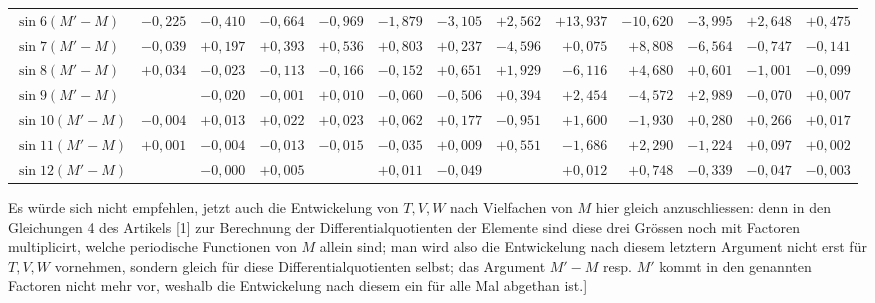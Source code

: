 \begin{landscape}
\begin{longtable}{@{}l|r|r|r|r|r|r|r|r|r|r|r|r@{}}
\(\sin 6(M'-M)\) & \(-0{,}225\) & \(-0{,}410\) & \(-0{,}664\) & \(-0{,}969\) & \(-1{,}879\) & \(-3{,}105\) & \(+2{,}562\) & \(+13{,}937\) & \(-10{,}620\) & \(-3{,}995\) & \(+2{,}648\) & \(+0{,}475\)\\
\(\sin 7(M'-M)\) & \(-0{,}039\) & \(+0{,}197\) & \(+0{,}393\) & \(+0{,}536\) & \(+0{,}803\) & \(+0{,}237\) & \(-4{,}596\) & \(+0{,}075\) & \(+8{,}808\) & \(-6{,}564\) & \(-0{,}747\) & \(-0{,}141\)\\
\(\sin 8(M'-M)\) & \(+0{,}034\) & \(-0{,}023\) & \(-0{,}113\) & \(-0{,}166\) & \(-0{,}152\) & \(+0{,}651\) & \(+1{,}929\) & \(-6{,}116\) & \(+4{,}680\) & \(+0{,}601\) & \(-1{,}001\) & \(-0{,}099\)\\
\(\sin 9(M'-M)\) &  & \(-0{,}020\) & \(-0{,}001\) & \(+0{,}010\) & \(-0{,}060\) & \(-0{,}506\) & \(+0{,}394\) & \(+2{,}454\) & \(-4{,}572\) & \(+2{,}989\) & \(-0{,}070\) & \(+0{,}007\)\\
\(\sin 10(M'-M)\) & \(-0{,}004\) & \(+0{,}013\) & \(+0{,}022\) & \(+0{,}023\) & \(+0{,}062\) & \(+0{,}177\) & \(-0{,}951\) & \(+1{,}600\) & \(-1{,}930\) & \(+0{,}280\) & \(+0{,}266\) & \(+0{,}017\)\\
\(\sin 11(M'-M)\) & \(+0{,}001\) & \(-0{,}004\) & \(-0{,}013\) & \(-0{,}015\) & \(-0{,}035\) & \(+0{,}009\) & \(+0{,}551\) & \(-1{,}686\) & \(+2{,}290\) & \(-1{,}224\) & \(+0{,}097\) & \(+0{,}002\)\\
\(\sin 12(M'-M)\) &  & \(-0{,}000\) & \(+0{,}005\) &  & \(+0{,}011\) & \(-0{,}049\) &  & \(+0{,}012\) & \(+0{,}748\) & \(-0{,}339\) & \(-0{,}047\) & \(-0{,}003\)\\
\end{longtable}
\fontsize{10}{13}\selectfont
Es würde sich nicht empfehlen, jetzt auch die Entwickelung von \(T, V, W\) nach Vielfachen von \(M\)
hier gleich anzuschliessen: denn in den Gleichungen 4 des Artikels [1] zur Berechnung der
Differentialquotienten der Elemente sind diese drei Grössen noch mit Factoren multiplicirt,
welche periodische Functionen von \(M\) allein sind; man wird also die Entwickelung nach diesem
letztern Argument nicht erst für \(T, V, W\) vornehmen, sondern gleich für diese
Differentialquotienten selbst; das Argument \(M'-M\) resp. \(M'\) kommt in den genannten Factoren
nicht mehr vor, weshalb die Entwickelung nach diesem ein für alle Mal abgethan ist.]
\clearpage
\endgroup
\end{landscape}
